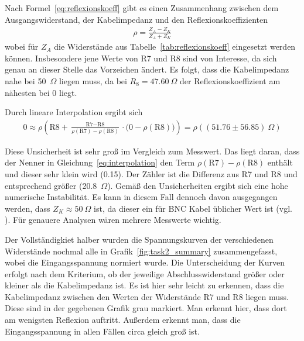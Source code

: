 \documentclass{article}
\begin{document}
Nach Formel~\eqref{eq:reflexionskoeff} gibt es einen Zusammenhang zwischen dem Ausgangswiderstand, der Kabelimpedanz und den Reflexionskoeffizienten
\begin{align*}
\rho = \frac{Z_A-Z_K}{Z_A+Z_K}
\end{align*}
wobei für $Z_A$ die Widerstände aus Tabelle~\ref{tab:reflexionskoeff} eingesetzt werden können. Insbesondere jene Werte von R7 und R8 sind von Interesse, da sich genau an dieser Stelle das Vorzeichen ändert. Es folgt, dass die Kabelimpedanz nahe bei 50~$\Omega$ liegen muss, da bei $R_8 = 47.60~\Omega$ der Reflexionskoeffizient am nähesten bei $0$ liegt.

Durch lineare Interpolation ergibt sich
\begin{align}
\label{eq:interpolation}
0 \approx \rho\left(\text{R8} + \frac{\text{R7}-\text{R8}}{\rho(\text{R7}) - \rho(\text{R8})} \cdot \big(0 -\rho(\text{R8}) \big)  \right) = \rho\left(\left(51.76 \pm 56.85\right)~\Omega\right)
\end{align}

Diese Unsicherheit ist sehr groß im Vergleich zum Messwert. Das liegt daran, dass der Nenner in Gleichung~\eqref{eq:interpolation} den Term $\rho(\text{R7}) - \rho(\text{R8})$ enthält und dieser sehr klein wird (0.15). Der Zähler ist die Differenz aus R7 und R8 und entsprechend größer (20.8~$\Omega$). Gemäß den Unsicherheiten ergibt sich eine hohe numerische Instabilität. Es kann in diesem Fall dennoch davon ausgegangen werden, dass $Z_K \approx 50~\Omega$ ist, da dieser ein für BNC Kabel üblicher Wert ist (vgl. \cite{bnc}). Für genauere Analysen wären mehrere Messwerte wichtig. 


Der Vollständigkiet halber wurden die Spannungskurven der verschiedenen Widerstände nochmal alle in Grafik~\ref{fig:task2_summary} zusammengefasst, wobei die Eingangsspannung normiert wurde. Die Unterscheidung der Kurven erfolgt nach dem Kriterium, ob der jeweilige Abschlusswiderstand größer oder kleiner als die Kabelimpedanz ist. Es ist hier sehr leicht zu erkennen, dass die Kabelimpedanz zwischen den Werten der Widerstände R7 und R8 liegen muss. Diese sind in der gegebenen Grafik grau markiert. Man erkennt hier, dass dort am wenigsten Reflexion auftritt. Außerdem erkennt man, dass die Eingangsspannung in allen Fällen circa gleich groß ist. 
\end{document}
